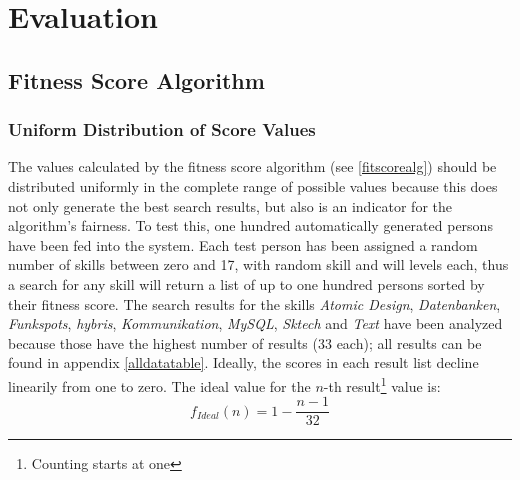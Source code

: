 \chapter{Evaluation}

\section{Fitness Score Algorithm}

\subsection{Uniform Distribution of Score Values}
The values calculated by the fitness score algorithm (see \ref{fitscorealg}) should be distributed uniformly in the complete range of possible values because this does not only generate the best search results, but also is an indicator for the algorithm's fairness.
To test this, one hundred automatically generated persons have been fed into the system. Each test person has been assigned a random number of skills between zero and 17, with random skill and will levels each, thus a search for any skill will return a list of up to one hundred persons sorted by their fitness score. The search results for the skills \textit{Atomic Design}, \textit{Datenbanken}, \textit{Funkspots}, \textit{hybris}, \textit{Kommunikation}, \textit{MySQL}, \textit{Sktech} and \textit{Text} have been analyzed because those have the highest number of results (33 each); all results can be found in appendix \ref{alldatatable}. Ideally, the scores in each result list decline linearily from one to zero. The ideal value for the $n$-th result\footnote{Counting starts at one} value is:
\[
	f_{Ideal}(n) = 1 - \frac{n-1}{32}
\]

